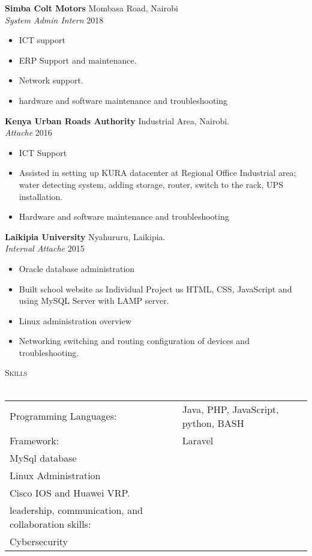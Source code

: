 \documentclass[a4paper]{article}
\newcommand{\lineunder} {
    \vspace*{-8pt} \\
    \hspace*{-18pt} \hrulefill \\
}
\newcommand{\header} [1] {
    {\hspace*{-18pt}\vspace*{6pt} \textsc{#1}}
    \vspace*{-6pt} \lineunder
}
\begin{document}
\textbf{Simba Colt Motors} \hfill Mombasa Road, Nairobi\\
\textit{System Admin Intern} \hfill 2018 \\
\vspace{-1mm}
\begin{itemize} \itemsep 1pt
	\item ICT support
	\item ERP Support and maintenance.
	\item Network support.
	\item hardware and software maintenance and troubleshooting
	
\end{itemize}
\textbf{Kenya Urban Roads Authority} \hfill Industrial Area, Nairobi.\\
\textit{Attache} \hfill2016\\
\vspace{-1mm}
\begin{itemize} \itemsep 1pt
	\item ICT Support
	\item Assisted in setting up KURA datacenter at Regional Office Industrial area; water detecting system, adding               	  	storage, router, switch to the rack, UPS installation.
	\item Hardware and software maintenance and troubleshooting
	
\end{itemize}
\textbf{Laikipia University} \hfill Nyahururu, Laikipia.\\
\textit{Internal Attache} \hfill 2015\\
\vspace{-1mm}
\begin{itemize} \itemsep 1pt
	\item Oracle database administration
	\item Built school website as Individual Project us HTML, CSS, JavaScript and using MySQL Server with LAMP server.
	\item Linux administration overview
	\item Networking switching and routing configuration of devices and troubleshooting.
\end{itemize}

\header{Skills}
\begin{tabular}{ l l }
	Programming Languages:                                & Java, PHP, JavaScript, python, BASH \\
	Framework:                                & Laravel\\
	MySql database                                 & \\
	Linux Administration                                 & \\
	Cisco IOS and Huawei VRP.   & \\
	leadership, communication, and collaboration skills: &                           \\
	Cybersecurity                                     &                           \\
\end{tabular}
\vspace{2mm}
\end{document}
